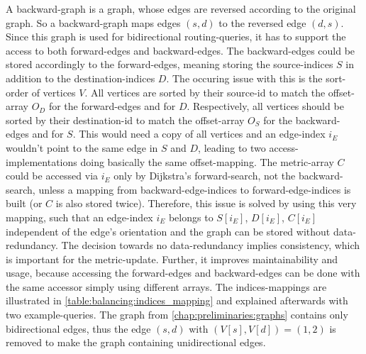         A backward-graph is a graph, whose edges are reversed according to the original graph.
        So a backward-graph maps edges $(s, d)$ to the reversed edge $(d, s)$.
        Since this graph is used for bidirectional routing-queries, it has to support the access to both forward-edges and backward-edges.
        The backward-edges could be stored accordingly to the forward-edges, meaning storing the source-indices $S$ in addition to the destination-indices $D$.
        The occuring issue with this is the sort-order of vertices $V$.
        All vertices are sorted by their source-id to match the offset-array $O_D$ for the forward-edges and for $D$.
        Respectively, all vertices should be sorted by their destination-id to match the offset-array $O_S$ for the backward-edges and for $S$.
        This would need a copy of all vertices and an edge-index $i_E$ wouldn't point to the same edge in $S$ and $D$, leading to two access-implementations doing basically the same offset-mapping.
        The metric-array $C$ could be accessed via $i_E$ only by Dijkstra's forward-search, not the backward-search, unless a mapping from backward-edge-indices to forward-edge-indices is built (or $C$ is also stored twice).
        Therefore, this issue is solved by using this very mapping, such that an edge-index $i_E$ belongs to $S[i_E]$, $D[i_E]$, $C[i_E]$ independent of the edge's orientation and the graph can be stored without data-redundancy.
        The decision towards no data-redundancy implies consistency, which is important for the metric-update.
        Further, it improves maintainability and usage, because accessing the forward-edges and backward-edges can be done with the same accessor simply using different arrays.
        The indices-mappings are illustrated in \cref{table:balancing:indices_mapping} and explained afterwards with two example-queries.
        The graph from \cref{chap:preliminaries:graphs} contains only bidirectional edges, thus the edge $(s, d)$ with $(V[s], V[d])=(1, 2)$ is removed to make the graph containing unidirectional edges.

